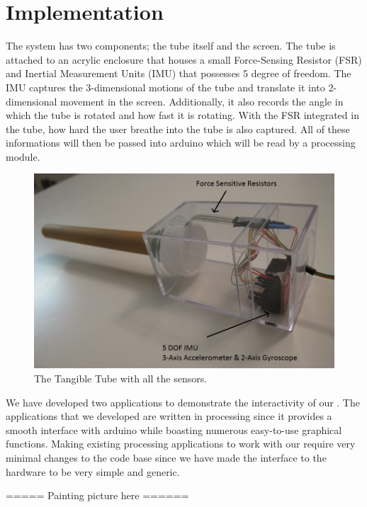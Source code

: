 \section{Implementation}\label{sec:impl}

The \tube system has two components; the tube itself and the screen. The tube is attached to an acrylic enclosure that houses a small Force-Sensing Resistor (FSR) and Inertial Measurement Units (IMU) that possesses 5 degree of freedom. The IMU captures the 3-dimensional motions of the tube and translate it into 2-dimensional movement in the screen. Additionally, it also records the angle in which the tube is rotated and how fast it is rotating. With the FSR integrated in the tube, how hard the user breathe into the tube is also captured. All of these informations will then be passed into arduino which will be read by a processing module.

\begin{figure}
  \centering
  \includegraphics[width=\linewidth]{./figs/impl1.png}
  \caption{The Tangible Tube with all the sensors.}
  \label{fig:impl1}
\end{figure}


We have developed two applications to demonstrate the interactivity of our \tube. The applications that we developed are written in processing since it provides a smooth interface with arduino while boasting numerous easy-to-use graphical functions. Making existing processing applications to work with our \tube require very minimal changes to the code base since we have made the interface to the hardware to be very simple and generic.

===== Painting picture here ======

